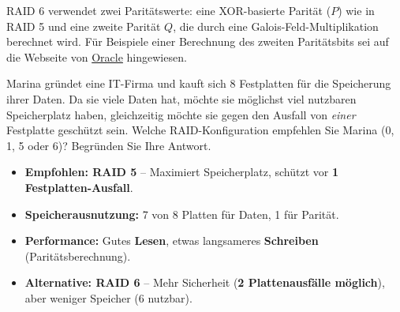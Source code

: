 RAID 6 verwendet zwei Paritätswerte: eine XOR-basierte Parität ($P$) wie in RAID 5 und eine zweite Parität $Q$, die durch eine Galois-Feld-Multiplikation berechnet wird. Für Beispiele einer Berechnung des zweiten Paritätsbits sei auf die Webseite von \href{https://blogs.oracle.com/solaris/post/understanding-raid-6-with-junior-high-math}{Oracle} hingewiesen.

\begin{myexercise}
Marina gründet eine IT-Firma und kauft sich 8 Festplatten für die Speicherung ihrer Daten. Da sie viele Daten hat, möchte sie möglichst viel nutzbaren Speicherplatz haben, gleichzeitig möchte sie gegen den Ausfall von \textit{einer} Festplatte geschützt sein. Welche RAID-Konfiguration empfehlen Sie Marina (0, 1, 5 oder 6)? Begründen Sie Ihre Antwort.
\begin{myanswer}
\begin{itemize}
    \item \textbf{Empfohlen: RAID 5} – Maximiert Speicherplatz, schützt vor \textbf{1 Festplatten-Ausfall}.
    \item \textbf{Speicherausnutzung:} 7 von 8 Platten für Daten, 1 für Parität.
    \item \textbf{Performance:} Gutes \textbf{Lesen}, etwas langsameres \textbf{Schreiben} (Paritätsberechnung).
    \item \textbf{Alternative: RAID 6} – Mehr Sicherheit (\textbf{2 Plattenausfälle möglich}), aber weniger Speicher (6 nutzbar).
\end{itemize}
\end{myanswer}


\end{myexercise}

